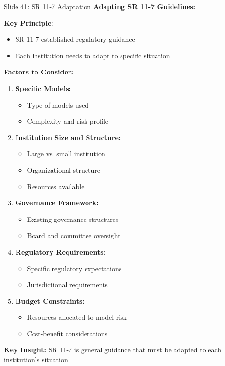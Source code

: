 \documentclass[8pt]{beamer}
\begin{document}
	\begin{frame}{Slide 41: SR 11-7 Adaptation}
		\fontsize{6.5}{7.5}\selectfont
		\textbf{Adapting SR 11-7 Guidelines:}
		
		\vspace{0.1cm}
		\textbf{Key Principle:}
		\begin{itemize}
			\item SR 11-7 established regulatory guidance
			\item Each institution needs to adapt to specific situation
		\end{itemize}
		
		\vspace{0.1cm}
		\textbf{Factors to Consider:}
		\begin{enumerate}
			\item \textbf{Specific Models:}
			\begin{itemize}
				\item Type of models used
				\item Complexity and risk profile
			\end{itemize}
			\item \textbf{Institution Size and Structure:}
			\begin{itemize}
				\item Large vs. small institution
				\item Organizational structure
				\item Resources available
			\end{itemize}
			\item \textbf{Governance Framework:}
			\begin{itemize}
				\item Existing governance structures
				\item Board and committee oversight
			\end{itemize}
			\item \textbf{Regulatory Requirements:}
			\begin{itemize}
				\item Specific regulatory expectations
				\item Jurisdictional requirements
			\end{itemize}
			\item \textbf{Budget Constraints:}
			\begin{itemize}
				\item Resources allocated to model risk
				\item Cost-benefit considerations
			\end{itemize}
		\end{enumerate}
		
		\textcolor{myblue}{\textbf{Key Insight:}} SR 11-7 is general guidance that \textcolor{myblue}{must be adapted to each institution's situation}!
	\end{frame}
	
\end{document}
